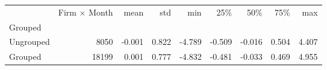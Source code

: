 \begin{tabular}{lrrrrrrrr}
\toprule
{} &  Firm $\times$ Month &   mean &    std &    min &    25\% &    50\% &    75\% &    max \\
Grouped   &                       &        &        &        &        &        &        &        \\
\midrule
Ungrouped &                  8050 & -0.001 &  0.822 & -4.789 & -0.509 & -0.016 &  0.504 &  4.407 \\
Grouped   &                 18199 &  0.001 &  0.777 & -4.832 & -0.481 & -0.033 &  0.469 &  4.955 \\
\bottomrule
\end{tabular}
